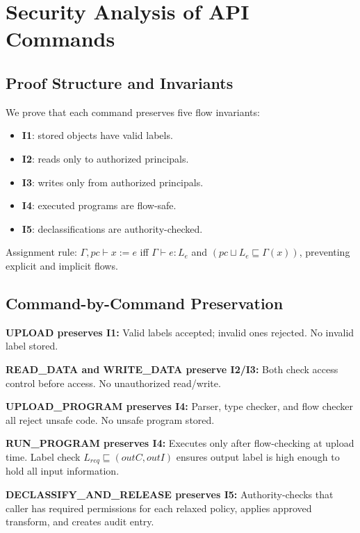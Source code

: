 \section{Security Analysis of API Commands}

\subsection{Proof Structure and Invariants}

We prove that each command preserves five flow invariants:

\begin{itemize}
    \item \textbf{I1}: stored objects have valid labels.
    \item \textbf{I2}: reads only to authorized principals.
    \item \textbf{I3}: writes only from authorized principals.
    \item \textbf{I4}: executed programs are flow-safe.
    \item \textbf{I5}: declassifications are authority-checked.
\end{itemize}

Assignment rule: $\Gamma,pc \vdash x := e$ iff $\Gamma \vdash e:L_e$ and $(pc \sqcup L_e \sqsubseteq \Gamma(x))$, preventing explicit and implicit flows.

\subsection{Command-by-Command Preservation}

\textbf{UPLOAD preserves I1:} Valid labels accepted; invalid ones rejected. No invalid label stored.

\textbf{READ\_DATA and WRITE\_DATA preserve I2/I3:} Both check access control before access. No unauthorized read/write.

\textbf{UPLOAD\_PROGRAM preserves I4:} Parser, type checker, and flow checker all reject unsafe code. No unsafe program stored.

\textbf{RUN\_PROGRAM preserves I4:} Executes only after flow-checking at upload time. Label check $L_{req} \sqsubseteq (outC, outI)$ ensures output label is high enough to hold all input information.

\textbf{DECLASSIFY\_AND\_RELEASE preserves I5:} Authority-checks that caller has required permissions for each relaxed policy, applies approved transform, and creates audit entry.

